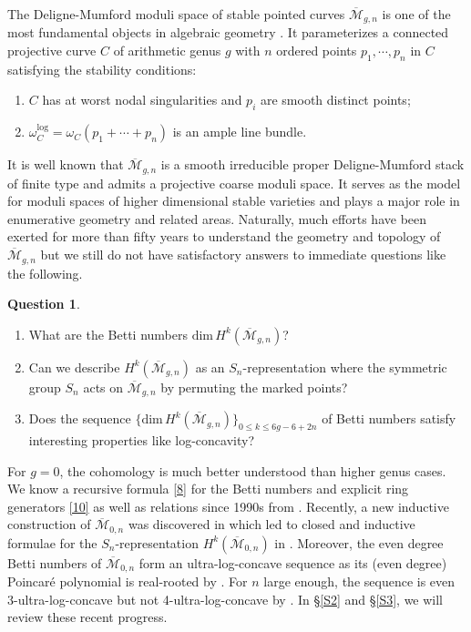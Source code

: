 \documentclass[11pt,letterpaper]{amsart}
\numberwithin{equation}{section}
\theoremstyle{definition}
\newtheorem{ques}[theorem]{Question}
\newcommand{\cal}{\mathcal}
\def\cM{{\cal M}}
\def\mzn{\overline{\cM}_{0,n} }
\def\mgn{\overline{\cM}_{g,n}}
\def\dim{\mathrm{dim} }
\def\log{\mathrm{log} }
\def\DM{Deligne-Mumford }
\begin{document}
The Deligne-Mumford moduli space of stable pointed curves $\mgn$ is one of the most fundamental objects in algebraic geometry \cite{DM}. It parameterizes a connected projective curve $C$ of arithmetic genus $g$ with $n$ ordered points $p_1,\cdots,p_n$ in $C$ satisfying the stability conditions:
\begin{enumerate}
    \item[(i)] $C$ has at worst nodal singularities and $p_i$ are smooth distinct points;
    \item[(ii)] $\omega_C^\log=\omega_C(p_1+\cdots+p_n)$ is an ample line bundle.
\end{enumerate}
It is well known that $\mgn$ is a smooth irreducible proper \DM stack of finite type and admits a projective coarse moduli space.
It serves as the model for moduli spaces of higher dimensional stable varieties and plays a major role in enumerative geometry and related areas.
Naturally, much efforts have been exerted for more than fifty years to understand the geometry and topology of $\mgn$ but we still do not have satisfactory answers to immediate questions like the following.
\begin{ques}\label{0}
\begin{enumerate}
\item What are the Betti numbers $\dim\, H^k(\mgn)$?
\item Can we describe $H^k(\mgn)$ as an $S_n$-representation where the symmetric group $S_n$ acts on $\mgn$ by permuting the marked points?
\item Does the sequence $\{\dim\, H^k(\mgn)\}_{0\le k\le 6g-6+2n}$ of Betti numbers satisfy interesting properties like log-concavity?
\end{enumerate}
\end{ques}
For $g=0$, the cohomology is much better understood than higher genus cases. We know a recursive formula \eqref{8} for the Betti numbers and explicit ring generators \eqref{10} as well as relations since 1990s from \cite{Getzler, Keel, Manin}. Recently, a new inductive construction of $\mzn$ was discovered in \cite{CK0} which led to  closed and inductive formulae for the $S_n$-representation $H^k(\mzn)$ in \cite{CKL1, CKL2}. Moreover, the even degree Betti numbers of $\mzn$ form an ultra-log-concave sequence as its (even degree) Poincar\'e polynomial is real-rooted by \cite{BK}. For $n$ large enough, the sequence is even 3-ultra-log-concave but not 4-ultra-log-concave by \cite{CK}.
In \S\ref{S2} and \S\ref{S3}, we will review these recent progress.
\end{document}
